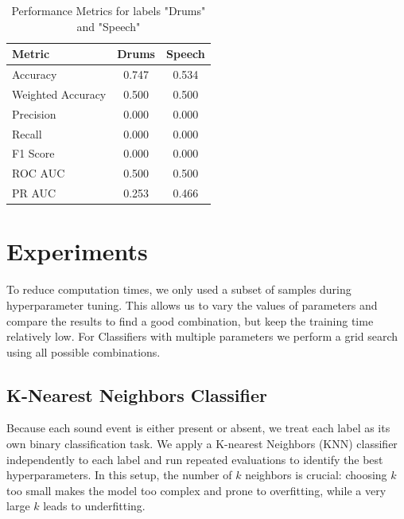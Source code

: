 \documentclass{article}
\begin{document}
\vspace{0.3cm}

\begin{table}[h!]
\centering
\begin{tabular}{|l|c|c|}
\hline
\textbf{Metric}            & \textbf{Drums} & \textbf{Speech} \\ \hline
Accuracy                   & 0.747          & 0.534           \\ \hline
Weighted Accuracy          & 0.500          & 0.500           \\ \hline
Precision                  & 0.000          & 0.000           \\ \hline
Recall                     & 0.000          & 0.000           \\ \hline
F1 Score                   & 0.000          & 0.000           \\ \hline
ROC AUC                    & 0.500          & 0.500           \\ \hline
PR AUC                     & 0.253          & 0.466           \\ \hline
\end{tabular}
\vspace{0.5cm}
\caption{Performance Metrics for labels "Drums" and "Speech"}
\label{tab:performance_metrics} %
\end{table}

\section{Experiments}
\label{sec:experiments}
To reduce computation times, we only used a subset of samples during hyperparameter tuning. This allows us to vary the values of parameters and compare the results to find a good combination, but keep the training time relatively low. For Classifiers with multiple parameters we perform a grid search using all possible combinations.

\subsection{K-Nearest Neighbors Classifier}
Because each sound event is either present or absent, we treat each label as its own binary classification task. We apply a K-nearest Neighbors (KNN) classifier independently to each label and run repeated evaluations to identify the best hyperparameters. In this setup, the number of $k$ neighbors is crucial: choosing $k$ too small makes the model too complex and prone to overfitting, while a very large $k$ leads to underfitting.
\end{document}
